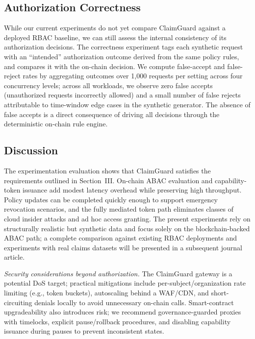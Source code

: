 \documentclass[conference]{IEEEtran}
\begin{document}
\subsection{Authorization Correctness}
While our current experiments do not yet compare ClaimGuard against a deployed RBAC baseline, we can still assess the internal consistency of its authorization decisions. 
The correctness experiment tags each synthetic request with an ``intended'' authorization outcome derived from the same policy rules, and compares it with the on-chain decision. We compute false-accept and false-reject rates by aggregating outcomes over 1{,}000 requests per setting across four concurrency levels; across all workloads, we observe zero false accepts (unauthorized requests incorrectly allowed) and a small number of false rejects attributable to time-window edge cases in the synthetic generator. 
The absence of false accepts is a direct consequence of driving all decisions through the deterministic on-chain rule engine.

\subsection{Discussion}
The experimentation evaluation shows that ClaimGuard satisfies the requirements outlined in Section~III. On-chain ABAC evaluation and capability-token issuance add modest latency overhead while preserving high throughput. Policy updates can be completed quickly enough to support emergency revocation scenarios, and the fully mediated token path eliminates classes of cloud insider attacks and ad hoc access granting. The present experiments rely on structurally realistic but synthetic data and focus solely on the blockchain-backed ABAC path; a complete comparison against existing RBAC deployments and experiments with real claims datasets will be presented in a subsequent journal article.

\noindent\textit{Security considerations beyond authorization.} The ClaimGuard gateway is a potential DoS target; practical mitigations include per-subject/organization rate limiting (e.g., token buckets), autoscaling behind a WAF/CDN, and short-circuiting denials locally to avoid unnecessary on-chain calls. Smart-contract upgradeability also introduces risk; we recommend governance-guarded proxies with timelocks, explicit pause/rollback procedures, and disabling capability issuance during pauses to prevent inconsistent states.

\end{document}
